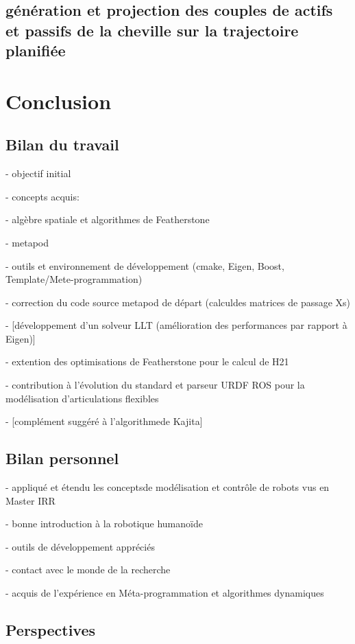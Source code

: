 \documentclass{report}
\begin{document}
\section{génération et projection des couples de actifs et passifs de la cheville sur la trajectoire planifiée}


\chapter*{Conclusion}
%

\section*{Bilan du travail}

- objectif initial

- concepts acquis:

	- algèbre spatiale et algorithmes de Featherstone
	
	- metapod
	
	- outils et environnement de développement (cmake, Eigen, Boost, Template/Mete-programmation)

- correction du code source metapod de départ (calculdes matrices de passage Xs)

- [développement d'un solveur LLT (amélioration des performances par rapport à Eigen)]

- extention des optimisations de Featherstone pour le calcul de H21

- contribution à l'évolution du standard et parseur URDF ROS pour la modélisation d'articulations flexibles

- [complément suggéré à l'algorithmede Kajita]


\section*{Bilan personnel}

- appliqué et étendu les conceptsde modélisation et contrôle de robots vus en Master IRR

- bonne introduction à la robotique humanoïde

- outils de développement appréciés

- contact avec le monde de la recherche

- acquis de l'expérience en Méta-programmation et algorithmes dynamiques


\section*{Perspectives}
\end{document}
